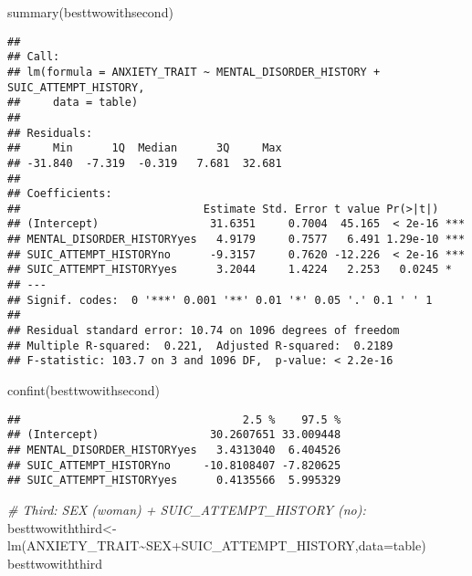 \documentclass[
]{book}
\newenvironment{Shaded}{\begin{snugshade}}{\end{snugshade}}
\newcommand{\AttributeTok}[1]{\textcolor[rgb]{0.77,0.63,0.00}{#1}}
\newcommand{\CommentTok}[1]{\textcolor[rgb]{0.56,0.35,0.01}{\textit{#1}}}
\newcommand{\FunctionTok}[1]{\textcolor[rgb]{0.00,0.00,0.00}{#1}}
\newcommand{\NormalTok}[1]{#1}
\newcommand{\OtherTok}[1]{\textcolor[rgb]{0.56,0.35,0.01}{#1}}
\newcommand{\SpecialCharTok}[1]{\textcolor[rgb]{0.00,0.00,0.00}{#1}}
\begin{document}
\begin{Shaded}
\begin{Highlighting}[]
\FunctionTok{summary}\NormalTok{(besttwowithsecond)}
\end{Highlighting}
\end{Shaded}

\begin{verbatim}
## 
## Call:
## lm(formula = ANXIETY_TRAIT ~ MENTAL_DISORDER_HISTORY + SUIC_ATTEMPT_HISTORY, 
##     data = table)
## 
## Residuals:
##     Min      1Q  Median      3Q     Max 
## -31.840  -7.319  -0.319   7.681  32.681 
## 
## Coefficients:
##                            Estimate Std. Error t value Pr(>|t|)    
## (Intercept)                 31.6351     0.7004  45.165  < 2e-16 ***
## MENTAL_DISORDER_HISTORYyes   4.9179     0.7577   6.491 1.29e-10 ***
## SUIC_ATTEMPT_HISTORYno      -9.3157     0.7620 -12.226  < 2e-16 ***
## SUIC_ATTEMPT_HISTORYyes      3.2044     1.4224   2.253   0.0245 *  
## ---
## Signif. codes:  0 '***' 0.001 '**' 0.01 '*' 0.05 '.' 0.1 ' ' 1
## 
## Residual standard error: 10.74 on 1096 degrees of freedom
## Multiple R-squared:  0.221,  Adjusted R-squared:  0.2189 
## F-statistic: 103.7 on 3 and 1096 DF,  p-value: < 2.2e-16
\end{verbatim}

\begin{Shaded}
\begin{Highlighting}[]
\FunctionTok{confint}\NormalTok{(besttwowithsecond)}
\end{Highlighting}
\end{Shaded}

\begin{verbatim}
##                                  2.5 %    97.5 %
## (Intercept)                 30.2607651 33.009448
## MENTAL_DISORDER_HISTORYyes   3.4313040  6.404526
## SUIC_ATTEMPT_HISTORYno     -10.8108407 -7.820625
## SUIC_ATTEMPT_HISTORYyes      0.4135566  5.995329
\end{verbatim}

\begin{Shaded}
\begin{Highlighting}[]
\CommentTok{\# Third: SEX (woman) + SUIC\_ATTEMPT\_HISTORY (no):}
\NormalTok{besttwowiththird}\OtherTok{\textless{}{-}}\FunctionTok{lm}\NormalTok{(ANXIETY\_TRAIT}\SpecialCharTok{\textasciitilde{}}\NormalTok{SEX}\SpecialCharTok{+}\NormalTok{SUIC\_ATTEMPT\_HISTORY,}\AttributeTok{data=}\NormalTok{table)}
\NormalTok{besttwowiththird}
\end{Highlighting}
\end{Shaded}
\end{document}
